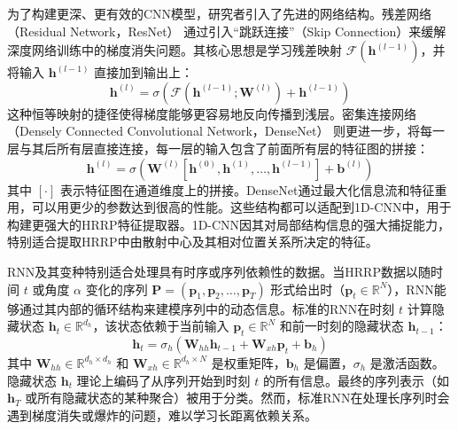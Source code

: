 为了构建更深、更有效的CNN模型，研究者引入了先进的网络结构。残差网络 （Residual Network，ResNet） 通过引入“跳跃连接”（Skip Connection）来缓解深度网络训练中的梯度消失问题。其核心思想是学习残差映射 $\mathcal{F}(\mathbf{h}^{(l-1)})$，并将输入 $\mathbf{h}^{(l-1)}$ 直接加到输出上：
\begin{equation}
    \mathbf{h}^{(l)} = \sigma(\mathcal{F}(\mathbf{h}^{(l-1)}; \mathbf{W}^{(l)}) + \mathbf{h}^{(l-1)})
    \label{eq:resnet_block}
\end{equation}
这种恒等映射的捷径使得梯度能够更容易地反向传播到浅层。密集连接网络 （Densely Connected Convolutional Network，DenseNet） 则更进一步，将每一层与其后所有层直接连接，每一层的输入包含了前面所有层的特征图的拼接：
\begin{equation}
    \mathbf{h}^{(l)} = \sigma(\mathbf{W}^{(l)} [\mathbf{h}^{(0)}, \mathbf{h}^{(1)}, \dots, \mathbf{h}^{(l-1)}] + \mathbf{b}^{(l)})
    \label{eq:densenet_block}
\end{equation}
其中 $[\cdot]$ 表示特征图在通道维度上的拼接。DenseNet通过最大化信息流和特征重用，可以用更少的参数达到很高的性能。这些结构都可以适配到1D-CNN中，用于构建更强大的HRRP特征提取器。1D-CNN因其对局部结构信息的强大捕捉能力，特别适合提取HRRP中由散射中心及其相对位置关系所决定的特征。

RNN及其变种特别适合处理具有时序或序列依赖性的数据。当HRRP数据以随时间 $t$ 或角度 $\alpha$ 变化的序列 $\mathbf{P} = (\mathbf{p}_1, \mathbf{p}_2, \dots, \mathbf{p}_T)$ 形式给出时（$\mathbf{p}_t \in \mathbb{R}^N$），RNN能够通过其内部的循环结构来建模序列中的动态信息。标准的RNN在时刻 $t$ 计算隐藏状态 $\mathbf{h}_t \in \mathbb{R}^{d_h}$，该状态依赖于当前输入 $\mathbf{p}_t \in \mathbb{R}^N$ 和前一时刻的隐藏状态 $\mathbf{h}_{t-1}$：
\begin{equation}
    \mathbf{h}_t = \sigma_h(\mathbf{W}_{hh} \mathbf{h}_{t-1} + \mathbf{W}_{xh} \mathbf{p}_t + \mathbf{b}_h)
    \label{eq:rnn_recurrence_dim}
\end{equation}
其中 $\mathbf{W}_{hh} \in \mathbb{R}^{d_h \times d_h}$ 和 $\mathbf{W}_{xh} \in \mathbb{R}^{d_h \times N}$ 是权重矩阵，$\mathbf{b}_h$ 是偏置，$\sigma_h$ 是激活函数。隐藏状态 $\mathbf{h}_t$ 理论上编码了从序列开始到时刻 $t$ 的所有信息。最终的序列表示（如 $\mathbf{h}_T$ 或所有隐藏状态的某种聚合）被用于分类。然而，标准RNN在处理长序列时会遇到梯度消失或爆炸的问题，难以学习长距离依赖关系。


